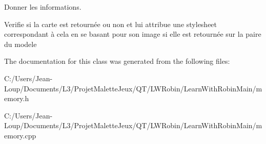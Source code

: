 Donner les informations. 

Verifie si la carte est retournée ou non et lui attribue une stylesheet correspondant à cela en se basant pour son image si elle est retournée sur la paire du modele 

The documentation for this class was generated from the following files\+:\begin{DoxyCompactItemize}
\item 
C\+:/\+Users/\+Jean-\/\+Loup/\+Documents/\+L3/\+Projet\+Malette\+Jeux/\+Q\+T/\+L\+W\+Robin/\+Learn\+With\+Robin\+Main/memory.\+h\item 
C\+:/\+Users/\+Jean-\/\+Loup/\+Documents/\+L3/\+Projet\+Malette\+Jeux/\+Q\+T/\+L\+W\+Robin/\+Learn\+With\+Robin\+Main/memory.\+cpp\end{DoxyCompactItemize}
